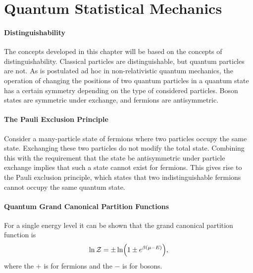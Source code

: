 \section{Quantum Statistical Mechanics}

\paragraph{Distinguishability}
The concepts developed in this chapter will be based on the concepts of distinguishability. Classical particles are distinguishable, but quantum particles are not. As is postulated ad hoc in non-relativistic quantum mechanics, the operation of changing the positions of two quantum particles in a quantum state has a certain symmetry depending on the type of considered particles. Boson states are symmetric under exchange, and fermions are antisymmetric.

\paragraph{The Pauli Exclusion Principle}
Consider a many-particle state of fermions where two particles occupy the same state. Exchanging these two particles do not modify the total state. Combining this with the requirement that the state be antisymmetric under particle exchange implies that such a state cannot exist for fermions. This gives rise to the Pauli exclusion principle, which states that two indistinguishable fermions cannot occupy the same quantum state.

\paragraph{Quantum Grand Canonical Partition Functions}

For a single energy level it can be shown that the grand canonical partition function is
\begin{align*}
	\ln{\mathcal{Z}} = \pm\ln(1 \pm e^{\beta(\mu - E)}),
\end{align*}
where the $+$ is for fermions and the $-$ is for bosons.

